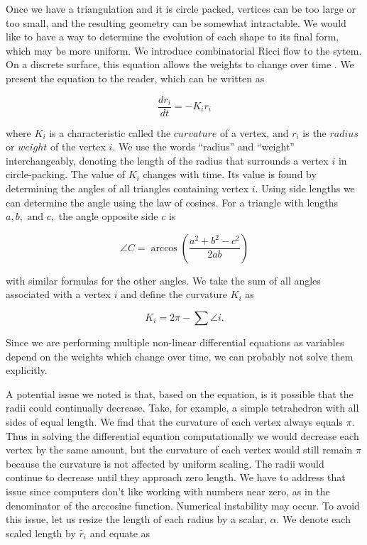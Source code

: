 \documentclass[12pt]{article}
\begin{document}
\noindent Once we have a triangulation and it is circle packed, vertices can be too large or too small, and the resulting geometry can be somewhat intractable. We would like to have a way to determine the evolution of each shape to its final form, which may be more uniform. We introduce combinatorial Ricci flow to the sytem. On a discrete surface, this equation allows the weights to change over time \cite{chowluo}. We present the equation to the reader, which can be written as

  \begin{equation}
  \label{Riccif}
  \frac{dr_i}{{dt}} = -K_ir_i
  \end{equation}
  
\noindent where $K_i$ is a characteristic called the $curvature$ of a vertex, and $r_i$ is the $radius$ or $weight$ of the vertex $i$. We use the words ``radius'' and ``weight'' interchangeably, denoting the length of the radius that surrounds a vertex $i$ in circle-packing. The value of $K_i$ changes with time. Its value is found by determining the angles of all triangles containing vertex $i$. Using side lengths we can determine the angle using the law of cosines. For a triangle with lengths $a, b,\mbox{ and }c,$ the angle opposite side $c$ is
  
  $$
  \angle C = \arccos(\frac{a^2 + b^2 - c^2}{2ab})
  $$
  
\noindent with similar formulas for the other angles. We take the sum of all angles associated with a vertex $i$ and define the curvature $K_i$ as

\begin{equation}
K_i = 2\pi - \sum{\angle i}.
\end{equation}
  
\noindent Since we are performing multiple non-linear differential equations as variables depend on the weights which change over time, we can probably not solve them explicitly.\newline
   
\noindent A potential issue we noted is that, based on the equation, is it possible that the radii could continually decrease. Take, for example, a simple tetrahedron with all sides of equal length. We find that the curvature of each vertex always equals $\pi$. Thus in solving the differential equation computationally we would decrease each vertex by the same amount, but the curvature of each vertex would still remain $\pi$ because the curvature is not affected by uniform scaling. The radii would continue to decrease until they approach zero length. We have to address that issue since computers don't like working with numbers near zero, as in the denominator of the arccosine function. Numerical instability may occur. To avoid this issue, let us resize the length of each radius by a scalar, $\alpha$. We denote each scaled length by $\tilde{r_i}$ and equate as
 
\end{document}
